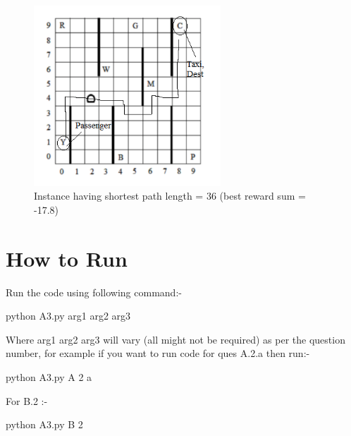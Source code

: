 \documentclass{article}
\begin{document}
\begin{enumerate}[a)]
\begin{center}
    \begin{figure}[H]
    \hfill\includegraphics[width=7cm]{instance.png}\hspace*{\fill}
    \caption{Instance having shortest path length = 36 (best reward sum = -17.8)}
    \label{fig: Instance having shortest path length = 36 }

\end{figure}
\end{center}
    
\section{How to Run}

Run the code using following command:- \\
\begin{center}
    python A3.py arg1 arg2 arg3\\

\end{center}

Where arg1 arg2 arg3 will vary (all might not be required) as per the question number, for example if you want to run code for ques A.2.a then run:- 

\begin{center}
    python A3.py A 2 a
\end{center}

For B.2 :- 


\begin{center}
    python A3.py B 2
\end{center}


\end{enumerate}
\end{document}
